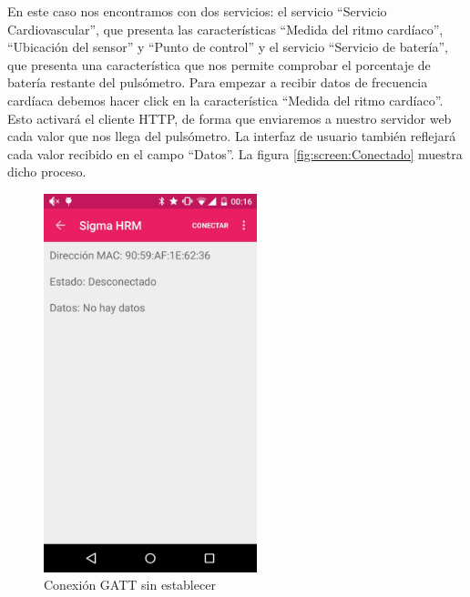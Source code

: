    En este caso nos encontramos con dos servicios: el servicio ``Servicio Cardiovascular'', que presenta las características ``Medida del ritmo cardíaco'', ``Ubicación del sensor'' y ``Punto de control'' y el servicio ``Servicio de batería'', que presenta una característica que nos permite comprobar el porcentaje de batería restante del pulsómetro. Para empezar a recibir datos de frecuencia cardíaca debemos hacer click en la característica ``Medida del ritmo cardíaco''. Esto activará el cliente HTTP, de forma que enviaremos a nuestro servidor web cada valor que nos llega del pulsómetro. La interfaz de usuario también reflejará cada valor recibido en el campo ``Datos''. La figura \ref{fig:screen:Conectado} muestra dicho proceso.
 
 \begin{figure}[H] \centering
 \begin{minipage}{0.45\textwidth}\centering
    \includegraphics[height=11cm]{graphs/AndroidDesconectado.png} \caption{Conexión GATT sin establecer}\label{fig:screen:Desconectado}
 \end{minipage}
 \hfill
\begin{minipage}{0.45\textwidth}\centering

\end{minipage}
\end{figure}
